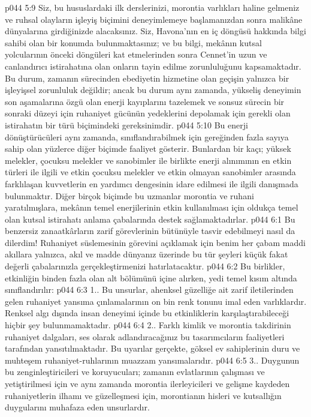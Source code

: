 \vs p044 5:9 Siz, bu hususlardaki ilk derslerinizi, morontia varlıkları haline gelmeniz ve ruhsal olayların işleyiş biçimini deneyimlemeye başlamanızdan sonra malikâne dünyalarına girdiğinizde alacaksınız. Siz, Havona’nın en iç döngüsü hakkında bilgi sahibi olan bir konumda bulunmaktasınız; ve bu bilgi, mekânın kutsal yolcularının önceki döngüleri kat etmelerinden sonra Cennet’in uzun ve canlandırıcı istirahatına olan onların tayin edilme zorunluluğunu kapsamaktadır. Bu durum, zamanın sürecinden ebediyetin hizmetine olan geçişin yalnızca bir işleyişsel zorunluluk değildir; ancak bu durum aynı zamanda, yükseliş deneyimin son aşamalarına özgü olan enerji kayıplarını tazelemek ve sonsuz sürecin bir sonraki düzeyi için ruhaniyet gücünün yedeklerini depolamak için gerekli olan istirahatın bir türü biçimindeki gereksinimdir.
\vs p044 5:10 Bu enerji dönüştürücüleri aynı zamanda, sınıflandırabilmek için gereğinden fazla sayıya sahip olan yüzlerce diğer biçimde faaliyet gösterir. Bunlardan bir kaçı; yüksek melekler, çocuksu melekler ve sanobimler ile birlikte enerji alınımının en etkin türleri ile ilgili ve etkin çocuksu melekler ve etkin olmayan sanobimler arasında farklılaşan kuvvetlerin en yardımcı dengesinin idare edilmesi ile ilgili danışmada bulunmaktır. Diğer birçok biçimde bu uzmanlar morontia ve ruhani yaratılmışlara, mekânın temel enerjilerinin etkin kullanılması için oldukça temel olan kutsal istirahatı anlama çabalarında destek sağlamaktadırlar.
\vs p044 6:1 Bu benzersiz zanaatkârların zarif görevlerinin bütünüyle tasvir edebilmeyi nasıl da dilerdim! Ruhaniyet süslemesinin görevini açıklamak için benim her çabam maddi akıllara yalnızca, akıl ve madde dünyanız üzerinde bu tür şeyleri küçük fakat değerli çabalarınızla gerçekleştirmenizi hatırlatacaktır.
\vs p044 6:2 Bu birlikler, etkinliğin binden fazla olan alt bölümünü içine alırken, yedi temel kısım altında sınıflandırılır:
\vs p044 6:3 1.. Bu unsurlar, ahenksel güzelliğe ait zarif iletilerinden gelen ruhaniyet yansıma çınlamalarının on bin renk tonunu imal eden varlıklardır. Renksel algı dışında insan deneyimi içinde bu etkinliklerin karşılaştırabileceği hiçbir şey bulunmamaktadır.
\vs p044 6:4 2.\bibnobreakspace {}. Farklı kimlik ve morontia takdirinin ruhaniyet dalgaları, ses olarak adlandıracağınız bu tasarımcıların faaliyetleri tarafından yansıtılmaktadır. Bu uyarılar gerçekte, göksel ev sahiplerinin duru ve muhteşem ruhaniyet\hyp{}ruhlarının muazzam yansımalarıdır.
\vs p044 6:5 3.\bibnobreakspace {}. Duygunun bu zenginleştiricileri ve koruyucuları; zamanın evlatlarının çalışması ve yetiştirilmesi için ve aynı zamanda morontia ilerleyicileri ve gelişme kaydeden ruhaniyetlerin ilhamı ve güzelleşmesi için, morontianın hisleri ve kutsallığın duygularını muhafaza eden unsurlardır.
